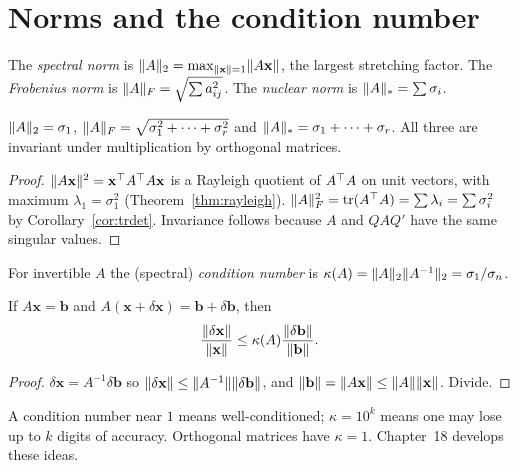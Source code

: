 \section{Norms and the condition number}

\begin{definition}
The \emph{spectral norm} is $\lVert A\rVert_2=\max_{\lVert\mathbf{x}\rVert=1}\lVert A\mathbf{x}\rVert$, the largest stretching factor. The \emph{Frobenius norm} is $\lVert A\rVert_F=\sqrt{\sum a_{ij}^2}$. The \emph{nuclear norm} is $\lVert A\rVert_*=\sum\sigma_i$.
\end{definition}

\begin{theorem}\label{thm:svdnorms}
$\lVert A\rVert_2=\sigma_1$, $\lVert A\rVert_F=\sqrt{\sigma_1^2+\dots+\sigma_r^2}$ and $\lVert A\rVert_*=\sigma_1+\dots+\sigma_r$. All three are invariant under multiplication by orthogonal matrices.
\end{theorem}

\begin{proof}
$\lVert A\mathbf{x}\rVert^2=\mathbf{x}^{\top} A^{\top} A\mathbf{x}$ is a Rayleigh quotient of $A^{\top} A$ on unit vectors, with maximum $\lambda_1=\sigma_1^2$ (Theorem~\ref{thm:rayleigh}). $\lVert A\rVert_F^2=\operatorname{tr}(A^{\top} A)=\sum\lambda_i=\sum\sigma_i^2$ by Corollary~\ref{cor:trdet}. Invariance follows because $A$ and $QAQ'$ have the same singular values.
\end{proof}

\begin{definition}
For invertible $A$ the (spectral) \emph{condition number} is $\kappa(A)=\lVert A\rVert_2\lVert A^{-1}\rVert_2=\sigma_1/\sigma_n$.
\end{definition}

\begin{theorem}\label{thm:cond}
If $A\mathbf{x}=\mathbf{b}$ and $A(\mathbf{x}+\delta\mathbf{x})=\mathbf{b}+\delta\mathbf{b}$, then
\[ \frac{\lVert\delta\mathbf{x}\rVert}{\lVert\mathbf{x}\rVert}\le\kappa(A)\frac{\lVert\delta\mathbf{b}\rVert}{\lVert\mathbf{b}\rVert}. \]
\end{theorem}

\begin{proof}
$\delta\mathbf{x}=A^{-1}\delta\mathbf{b}$ so $\lVert\delta\mathbf{x}\rVert\le\lVert A^{-1}\rVert\lVert\delta\mathbf{b}\rVert$, and $\lVert\mathbf{b}\rVert=\lVert A\mathbf{x}\rVert\le\lVert A\rVert\lVert\mathbf{x}\rVert$. Divide.
\end{proof}

A condition number near $1$ means well-conditioned; $\kappa=10^{k}$ means one may lose up to $k$ digits of accuracy. Orthogonal matrices have $\kappa=1$. Chapter~18 develops these ideas.

